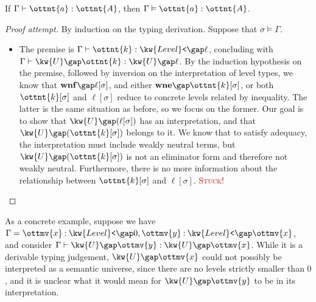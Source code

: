 \documentclass[a4paper,UKenglish,cleveref,autoref,thm-restate]{lipics-v2021}
\begin{document}
\begin{claim}[Soundness]
  If $ \Gamma  \vdash  \ottnt{a}  \mathrel{:}  \ottnt{A} $, then $ \Gamma  \vDash  \ottnt{a}  :  \ottnt{A} $.
\end{claim}

\begin{proof}[Proof attempt]
  By induction on the typing derivation.
  Suppose that $ \sigma  \vDash  \Gamma $.
  \begin{itemize}[topsep=0pt]
    \item \textit{}
      The premise is $ \Gamma  \vdash  \ottnt{k}  \mathrel{:}   \kw{Level}\texttt{<} \gap  \ell  $,
      concluding with $ \Gamma  \vdash   \kw{U} \gap  \ottnt{k}   \mathrel{:}   \kw{U} \gap  \ell  $.
      By the induction hypothesis on the premise,
      followed by inversion on the interpretation of level types,
      we know that $ \mathbf{wnf} \gap   \ell [  \sigma  ]  $, and either $ \mathbf{wne} \gap   \ottnt{k} [  \sigma  ]  $,
      or both $ \ottnt{k} [  \sigma  ] $ and $ \ell [  \sigma  ] $ reduce to concrete levels related by inequality.
      The latter is the same situation as before,
      so we focus on the former.
      Our goal is to show that $ \kw{U} \gap   (  \ell [  \sigma  ]  )  $ has an interpretation,
      and that $ \kw{U} \gap   (  \ottnt{k} [  \sigma  ]  )  $ belongs to it.
      We know that to satisfy adequacy,
      the interpretation must include weakly neutral terms,
      but $ \kw{U} \gap   (  \ottnt{k} [  \sigma  ]  )  $ is not an eliminator form and therefore not weakly neutral.
      Furthermore, there is no more information about the relationship
      between $ \ottnt{k} [  \sigma  ] $ and $ \ell [  \sigma  ] $.
      \textcolor{red}{\textsc{Stuck!}} \qedhere
  \end{itemize}
\end{proof}

As a concrete example,
suppose we have $\Gamma =   \ottmv{x}  \mathbin{:}   \kw{Level}\texttt{<} \gap   0    ,  \ottmv{y}  \mathbin{:}   \kw{Level}\texttt{<} \gap  \ottmv{x}  $,
and consider $ \Gamma  \vdash   \kw{U} \gap  \ottmv{y}   \mathrel{:}   \kw{U} \gap  \ottmv{x}  $.
While it is a derivable typing judgement,
$ \kw{U} \gap  \ottmv{x} $ could not possibly be interpreted as a semantic universe,
since there are no levels strictly smaller than $0$,
and it is unclear what it would mean for $ \kw{U} \gap  \ottmv{y} $ to be in its interpretation.
\fi
\end{document}
